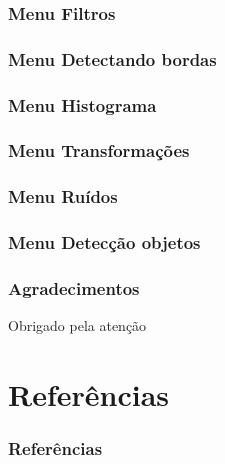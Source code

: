 \documentclass[12pt]{beamer}
\begin{document}
\begin{frame}
    \frametitle{Menu Filtros}
\end{frame}

\begin{frame}
    \frametitle{Menu Detectando bordas}
\end{frame}

\begin{frame}
    \frametitle{Menu Histograma}
\end{frame}

\begin{frame}
    \frametitle{Menu Transformações}
\end{frame}

\begin{frame}
    \frametitle{Menu Ruídos}
\end{frame}

\begin{frame}
    \frametitle{Menu Detecção objetos}
\end{frame}

\begin{frame}
    \frametitle{Agradecimentos}
    \centering
    \Huge{Obrigado pela atenção}
\end{frame}

\section{Referências}\label{Referências}
\begin{frame}[allowframebreaks]
    \frametitle{Referências} 
    
\end{frame}
\end{document}
